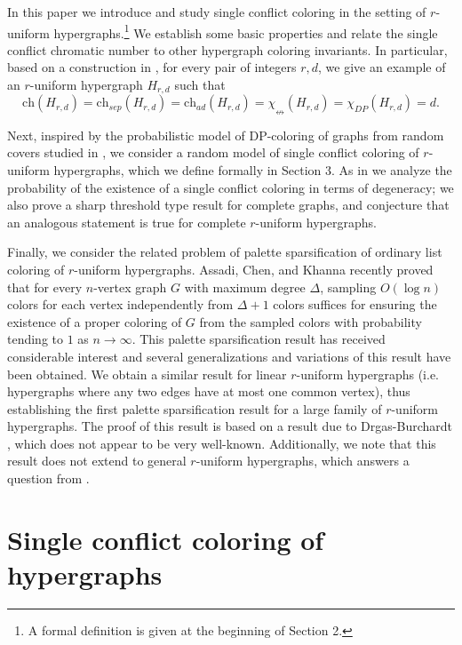 \documentclass[12pt]{article}
\newcommand{\single}{\chi_{\nleftrightarrow}}
\newcommand{\ch}{\mathrm{ch}}
\newcommand{\1}{\mathds{1}}
\begin{document}
	In this paper we introduce and study
	single conflict coloring in the setting
	of $r$-uniform hypergraphs.\footnote{A formal definition is given at the beginning of Section 2.}
	We establish some basic properties and relate the single conflict chromatic number to other hypergraph
	coloring invariants. 
	In particular, based on a construction in \cite{KostochkaZhu}, for every pair of integers $r,d$,
	we give an example of an $r$-uniform hypergraph $H_{r,d}$ such that
	$$\ch(H_{r,d}) = \ch_{sep}(H_{r,d}) = \ch_{ad}(H_{r,d}) = \single(H_{r,d}) = 
	\chi_{DP}(H_{r,d}) =d.$$

	
	Next, inspired by the probabilistic model of DP-coloring of graphs from random covers studied in
	\cite{BernshteynDominikKaulMudrock},
	we consider a random model of single conflict coloring of $r$-uniform hypergraphs, which we define
	formally in Section 3. As in \cite{BernshteynDominikKaulMudrock} we analyze the probability
	of the existence of a single conflict coloring in terms of degeneracy; we also prove a sharp
	threshold type result for complete graphs, and conjecture that an analogous statement is
	true for complete $r$-uniform hypergraphs.
	
	Finally, we consider the related problem of palette sparsification of ordinary list coloring
	of $r$-uniform hypergraphs.
	Assadi, Chen, and Khanna \cite{AssadiChenKhanna} recently proved that for every $n$-vertex graph $G$
	with maximum degree $\Delta$, sampling $O(\log n)$ colors for each vertex independently
	from $\Delta+1$
	colors suffices for ensuring the existence of a proper coloring of $G$ from the sampled colors
	with probability tending to $1$ as $n \to \infty$. 
	This palette sparsification result
	has received considerable interest and several generalizations and 
	variations of this result have been obtained.
	We obtain a similar result for linear $r$-uniform hypergraphs (i.e. hypergraphs where any two edges have at
	most one common vertex), thus establishing the first palette sparsification
	result for a large family of $r$-uniform hypergraphs. The proof of this result is based on
	a result due to 
	Drgas-Burchardt \cite{Drgas}, which does not appear to be very well-known.
	Additionally, we note that this result does not extend to general $r$-uniform hypergraphs, which answers
	a question from \cite{Casselgren5}.


\section{Single conflict coloring of hypergraphs}
	
\end{document}
